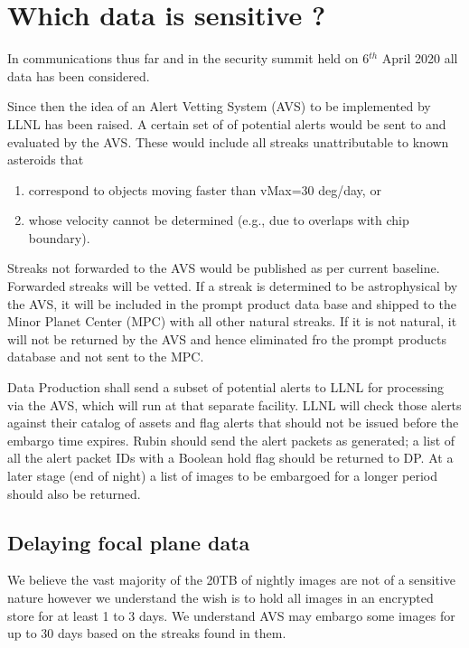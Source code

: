 \section{Which data is sensitive ?} \label{sec:which}

In communications thus far and in the security summit held on 6$^{th}$ April 2020 all data has been considered.

Since then the idea of an Alert Vetting System (AVS) to be implemented by LLNL has been raised.
A certain set of of potential alerts  would be sent to  and evaluated by the AVS.
These would include  all streaks unattributable to known asteroids that
\begin{enumerate}
\item correspond to objects moving faster than vMax=30 deg/day, or
\item  whose velocity cannot be determined (e.g., due to overlaps with chip boundary).
\end{enumerate}
Streaks not forwarded to the AVS would be published as per current baseline.
Forwarded streaks will be vetted. If a streak is determined to be astrophysical by the AVS, it will be included in the prompt product data base and shipped to the Minor Planet Center (MPC) with all other natural streaks. If it is not natural, it will not be returned by the AVS and hence eliminated fro the prompt products database and not sent to the MPC.

 { Data Production  shall send a subset of potential alerts to LLNL for processing via the AVS, which will run at that separate facility. LLNL will check those alerts against their catalog of assets and flag alerts that should not be issued before the embargo time expires. Rubin should send the alert packets as generated; a list of all the alert packet IDs with a Boolean hold flag should be returned to DP. At a later stage (end of night) a list of images to be embargoed for a longer period should also be returned.}

\subsection{Delaying focal plane data}
We believe the vast majority of the 20TB of nightly images are not of a sensitive nature however we understand the wish is to hold all images in an encrypted store for at least 1 to 3 days.
We understand AVS may embargo some images for up to 30 days based on the streaks found in them.



